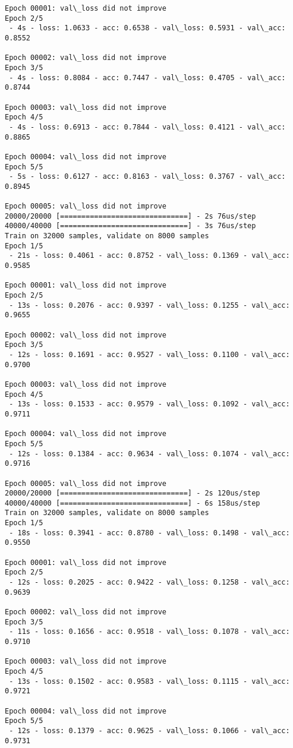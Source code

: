 \documentclass[11pt]{article}
\begin{document}
\begin{Verbatim}[commandchars=\\\{\}]
Epoch 00001: val\_loss did not improve
Epoch 2/5
 - 4s - loss: 1.0633 - acc: 0.6538 - val\_loss: 0.5931 - val\_acc: 0.8552

Epoch 00002: val\_loss did not improve
Epoch 3/5
 - 4s - loss: 0.8084 - acc: 0.7447 - val\_loss: 0.4705 - val\_acc: 0.8744

Epoch 00003: val\_loss did not improve
Epoch 4/5
 - 4s - loss: 0.6913 - acc: 0.7844 - val\_loss: 0.4121 - val\_acc: 0.8865

Epoch 00004: val\_loss did not improve
Epoch 5/5
 - 5s - loss: 0.6127 - acc: 0.8163 - val\_loss: 0.3767 - val\_acc: 0.8945

Epoch 00005: val\_loss did not improve
20000/20000 [==============================] - 2s 76us/step
40000/40000 [==============================] - 3s 76us/step
Train on 32000 samples, validate on 8000 samples
Epoch 1/5
 - 21s - loss: 0.4061 - acc: 0.8752 - val\_loss: 0.1369 - val\_acc: 0.9585

Epoch 00001: val\_loss did not improve
Epoch 2/5
 - 13s - loss: 0.2076 - acc: 0.9397 - val\_loss: 0.1255 - val\_acc: 0.9655

Epoch 00002: val\_loss did not improve
Epoch 3/5
 - 12s - loss: 0.1691 - acc: 0.9527 - val\_loss: 0.1100 - val\_acc: 0.9700

Epoch 00003: val\_loss did not improve
Epoch 4/5
 - 13s - loss: 0.1533 - acc: 0.9579 - val\_loss: 0.1092 - val\_acc: 0.9711

Epoch 00004: val\_loss did not improve
Epoch 5/5
 - 12s - loss: 0.1384 - acc: 0.9634 - val\_loss: 0.1074 - val\_acc: 0.9716

Epoch 00005: val\_loss did not improve
20000/20000 [==============================] - 2s 120us/step
40000/40000 [==============================] - 6s 158us/step
Train on 32000 samples, validate on 8000 samples
Epoch 1/5
 - 18s - loss: 0.3941 - acc: 0.8780 - val\_loss: 0.1498 - val\_acc: 0.9550

Epoch 00001: val\_loss did not improve
Epoch 2/5
 - 12s - loss: 0.2025 - acc: 0.9422 - val\_loss: 0.1258 - val\_acc: 0.9639

Epoch 00002: val\_loss did not improve
Epoch 3/5
 - 11s - loss: 0.1656 - acc: 0.9518 - val\_loss: 0.1078 - val\_acc: 0.9710

Epoch 00003: val\_loss did not improve
Epoch 4/5
 - 13s - loss: 0.1502 - acc: 0.9583 - val\_loss: 0.1115 - val\_acc: 0.9721

Epoch 00004: val\_loss did not improve
Epoch 5/5
 - 12s - loss: 0.1379 - acc: 0.9625 - val\_loss: 0.1066 - val\_acc: 0.9731


\end{Verbatim}
\end{document}
